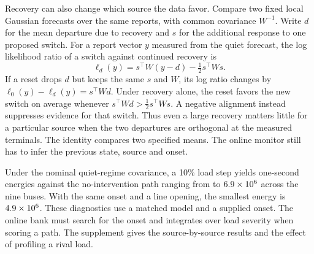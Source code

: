 Recovery can also change which source the data favor. Compare two
fixed local Gaussian forecasts over the same reports, with common
covariance $W^{-1}$. Write $d$ for the mean departure due to recovery
and $s$ for the additional response to one proposed switch. For a report
vector $y$ measured from the quiet forecast, the log likelihood ratio
of a switch against continued recovery is
\[
 \ell_d(y)=s^\top W(y-d)-\tfrac12 s^\top Ws .
\]
If a reset drops $d$ but keeps the same $s$ and $W$, its log ratio
changes by $\ell_0(y)-\ell_d(y)=s^\top Wd$. Under recovery alone,
the reset favors the new switch on average whenever
$s^\top Wd>\tfrac12s^\top Ws$. A negative alignment instead suppresses
evidence for that switch. Thus even a large recovery matters little
for a particular source when the two departures are orthogonal at
the measured terminals. The identity compares two specified means.
The online monitor still has to infer the previous state, source
and onset.

Under the nominal quiet-regime covariance, a 10\% load step yields
one-second energies against the no-intervention path ranging from
\RevInfoLoadMin{} to $6.9\times10^{6}$ across the nine buses. With the
same onset and a line opening, the smallest energy is
$4.9\times10^{6}$. These diagnostics use a matched model and a supplied
onset. The online bank must search for the onset and integrates over load
severity when scoring a path. The supplement gives the source-by-source
results and the effect of profiling a rival load.
